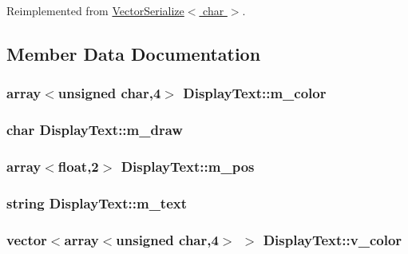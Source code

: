 Reimplemented from \hyperlink{classVectorSerialize_a929f94f68d0a99c61308520a679ae1a2}{Vector\-Serialize$<$ char $>$}.



\subsection{Member Data Documentation}
\hypertarget{classDisplayText_a680e8fb0a1dbd15c0fc9b60106f8a377}{
\subsubsection[{m\-\_\-color}]{\setlength{\rightskip}{0pt plus 5cm}array$<$unsigned char,4$>$ Display\-Text\-::m\-\_\-color}}\label{classDisplayText_a680e8fb0a1dbd15c0fc9b60106f8a377}
\hypertarget{classDisplayText_a886201e135220482b8507be2b671544b}{
\subsubsection[{m\-\_\-draw}]{\setlength{\rightskip}{0pt plus 5cm}char Display\-Text\-::m\-\_\-draw}}\label{classDisplayText_a886201e135220482b8507be2b671544b}
\hypertarget{classDisplayText_ae67cf19d70a36dac532b1a57daac904b}{
\subsubsection[{m\-\_\-pos}]{\setlength{\rightskip}{0pt plus 5cm}array$<$float,2$>$ Display\-Text\-::m\-\_\-pos}}\label{classDisplayText_ae67cf19d70a36dac532b1a57daac904b}
\hypertarget{classDisplayText_a932a5d5bfd33d578faddb55ff098f180}{
\subsubsection[{m\-\_\-text}]{\setlength{\rightskip}{0pt plus 5cm}string Display\-Text\-::m\-\_\-text}}\label{classDisplayText_a932a5d5bfd33d578faddb55ff098f180}
\hypertarget{classDisplayText_af6d153a33c304bb21445e62ca402f72f}{
\subsubsection[{v\-\_\-color}]{\setlength{\rightskip}{0pt plus 5cm}vector$<$array$<$unsigned char,4$>$ $>$ Display\-Text\-::v\-\_\-color}}\label{classDisplayText_af6d153a33c304bb21445e62ca402f72f}

